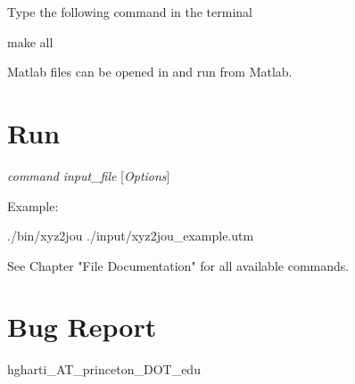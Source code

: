 Type the following command in the terminal

make all

Matlab files can be opened in and run from Matlab.

\section{Run}

{\em command} {\em input\_file} [{\em Options}]

Example:

./bin/xyz2jou ./input/xyz2jou\_example.utm

See Chapter "File Documentation" for all available commands. 

\section{Bug Report}

hgharti\_AT\_princeton\_DOT\_edu
